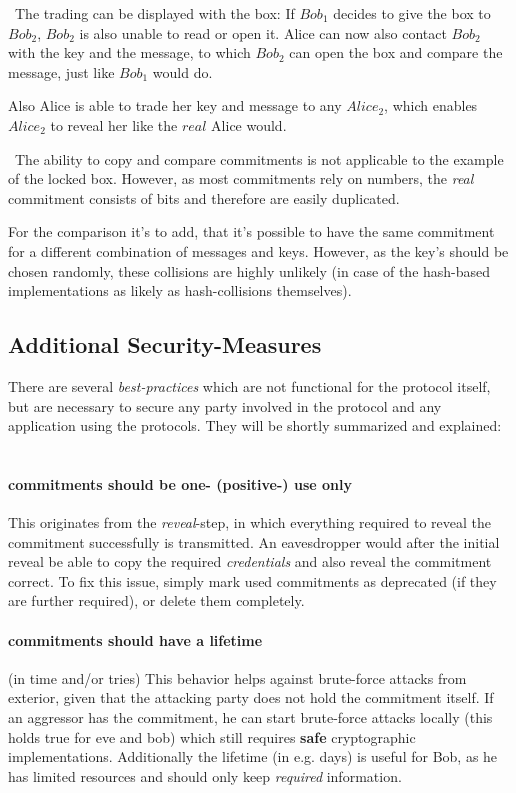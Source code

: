 ~\newline The trading can be displayed with the box: If $Bob_1$ decides to give the box to $Bob_2$, $Bob_2$ is also unable to read or open it. Alice can now also contact $Bob_2$ with the key and the message, to which $Bob_2$ can open the box and compare the message, just like $Bob_1$ would do. 

Also Alice is able to trade her key and message to any $Alice_2$, which enables $Alice_2$ to reveal her like the $real$ Alice would. 

~\newline The ability to copy and compare commitments is not applicable to the example of the locked box. However, as most commitments rely on numbers, the \textit{real} commitment consists of bits and therefore are easily duplicated. 

For the comparison it's to add, that it's possible to have the same commitment for a different combination of messages and keys. However, as the key's should be chosen randomly, these collisions are highly unlikely (in case of the hash-based implementations as likely as hash-collisions themselves). 
\subsection{Additional Security-Measures}
There are several \textit{best-practices} which are not functional for the protocol itself, but are necessary to secure any party involved in the protocol and any application using the protocols. They will be shortly summarized and explained: ~\newline

	\paragraph{commitments should be one- (positive-) use only} This originates from the \textit{reveal}-step, in which everything required to reveal the commitment successfully is transmitted. An eavesdropper would after the initial reveal be able to copy the required \textit{credentials} and also reveal the commitment correct.  To fix this issue, simply mark used commitments as deprecated (if they are further required), or delete them completely. 
	\paragraph{commitments should have a lifetime} (in time and/or tries)
	This behavior helps against brute-force attacks from exterior, given that the attacking party does not hold the commitment itself. If an aggressor has the commitment, he can start brute-force attacks locally (this holds true for eve and bob) which still requires \textbf{safe} cryptographic implementations.
	Additionally the lifetime (in e.g. days) is useful for Bob, as he has limited resources and should only keep \textit{required} information. 

